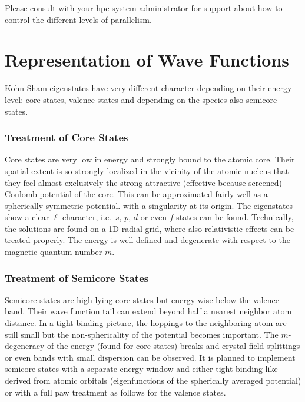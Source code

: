 \documentclass[oribibl]{llncs}
\begin{document}
Please consult with your \ac{hpc} system administrator for support
about how to control the different levels of parallelism.

\section{Representation of Wave Functions}

Kohn-Sham eigenstates have very different character depending on their energy level: core states, valence states and depending on the species also semicore states.
\subsubsection{Treatment of Core States}
Core states are very low in energy and strongly bound 
to the atomic core.
Their spatial extent is so strongly localized 
in the vicinity of the atomic nucleus 
that they feel almost exclusively the strong attractive 
(effective because screened) Coulomb potential of the core. 
This can be approximated fairly well as a spherically symmetric potential.
with a singularity at its origin.
The eigenstates show a clear $\ell$-character, 
i.e.~$s$, $p$, $d$ or even $f$ states can be found.
Technically, the solutions are found on a 1D radial grid,
where also relativistic effects can be treated properly.
The energy is well defined and degenerate with respect to
the magnetic quantum number $m$.

\subsubsection{Treatment of Semicore States}
Semicore states are high-lying core states
but energy-wise below the valence band.
Their wave function tail can extend beyond half a nearest neighbor atom distance.
In a tight-binding picture, the hoppings to the neighboring atom are still small
but the non-sphericality of the potential becomes important.
The $m$-degeneracy of the energy (found for core states) breaks 
and crystal field splittings or even bands with small dispersion can be observed.
It is planned to implement semicore states with a separate energy window
and either tight-binding like derived from atomic orbitals 
(eigenfunctions of the spherically averaged potential) 
or with a full \ac{paw} treatment as follows for the valence states.
\end{document}
